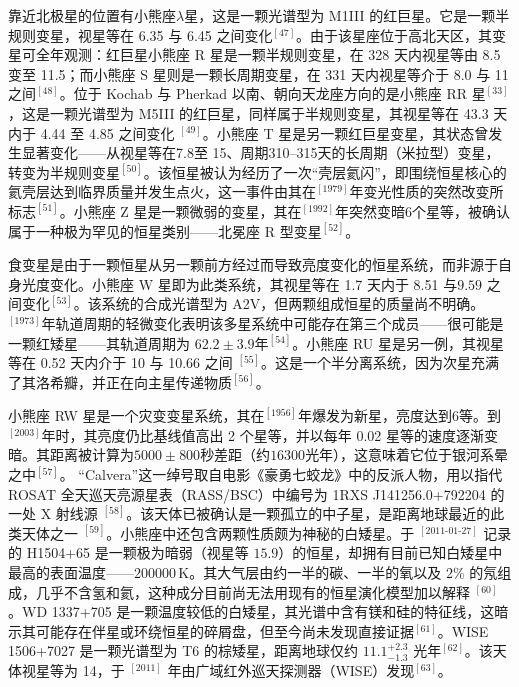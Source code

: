 靠近北极星的位置有小熊座$\lambda$星，这是一颗光谱型为 M1III 的红巨星。它是一颗半规则变星，视星等在 6.35 与 6.45 之间变化$^{[47]}$。由于该星座位于高北天区，其变星可全年观测：红巨星小熊座 R 星是一颗半规则变星，在 328 天内视星等由 8.5 变至 11.5；而小熊座 S 星则是一颗长周期变星，在 331 天内视星等介于 8.0 与 11 之间$^{[48]}$。位于 Kochab 与 Pherkad 以南、朝向天龙座方向的是小熊座 RR 星$^{[33]}$，这是一颗光谱型为 M5III 的红巨星，同样属于半规则变星，其视星等在 43.3 天内于 4.44 至 4.85 之间变化 $^{[49]}$。小熊座 T 星是另一颗红巨星变星，其状态曾发生显著变化——从视星等在7.8至 15、周期310--315天的长周期（米拉型）变星，转变为半规则变星$^{[50]}$。该恒星被认为经历了一次“壳层氦闪”，即围绕恒星核心的氦壳层达到临界质量并发生点火，这一事件由其在$^{[1979]}$年变光性质的突然改变所标志$^{[51]}$。小熊座 Z 星是一颗微弱的变星，其在$^{[1992]}$年突然变暗$6$个星等，被确认属于一种极为罕见的恒星类别——北冕座 R 型变星$^{[52]}$。

食变星是由于一颗恒星从另一颗前方经过而导致亮度变化的恒星系统，而非源于自身光度变化。小熊座 W 星即为此类系统，其视星等在 1.7 天内于 8.51 与$9.59$ 之间变化$^{[53]}$。该系统的合成光谱型为 A2V，但两颗组成恒星的质量尚不明确。$^{[1973]}$年轨道周期的轻微变化表明该多星系统中可能存在第三个成员——很可能是一颗红矮星——其轨道周期为 $62.2\pm3.9$年$^{[54]}$。小熊座 RU 星是另一例，其视星等在 0.52 天内介于 10 与 10.66 之间 $^{[55]}$。这是一个半分离系统，因为次星充满了其洛希瓣，并正在向主星传递物质$^{[56]}$。

小熊座 RW 星是一个灾变变星系统，其在$^{[1956]}$年爆发为新星，亮度达到$6$等。到$^{[2003]}$年时，其亮度仍比基线值高出 2 个星等，并以每年 0.02 星等的速度逐渐变暗。其距离被计算为$5000\pm800$秒差距（约$16300$光年），这意味着它位于银河系晕之中$^{[57]}$。
“Calvera”这一绰号取自电影《豪勇七蛟龙》中的反派人物，用以指代 ROSAT 全天巡天亮源星表（RASS/BSC）中编号为 1RXS J141256.0+792204 的一处 X 射线源 $^{[58]}$。该天体已被确认是一颗孤立的中子星，是距离地球最近的此类天体之一 $^{[59]}$。小熊座中还包含两颗性质颇为神秘的白矮星。于 $^{[2011\text{-}01\text{-}27]}$ 记录的 H1504+65 是一颗极为暗弱（视星等 $15.9$）的恒星，却拥有目前已知白矮星中最高的表面温度——$200000\,\mathrm{K}$。其大气层由约一半的碳、一半的氧以及 $2\%$ 的氖组成，几乎不含氢和氦，这种成分目前尚无法用现有的恒星演化模型加以解释 $^{[60]}$。WD 1337+705 是一颗温度较低的白矮星，其光谱中含有镁和硅的特征线，这暗示其可能存在伴星或环绕恒星的碎屑盘，但至今尚未发现直接证据$^{[61]}$。WISE 1506+7027 是一颗光谱型为 T6 的棕矮星，距离地球仅约 $11.1^{+2.3}_{-1.3}$ 光年$^{[62]}$。该天体视星等为 14，于 $^{[2011]}$ 年由广域红外巡天探测器（WISE）发现$^{[63]}$。


